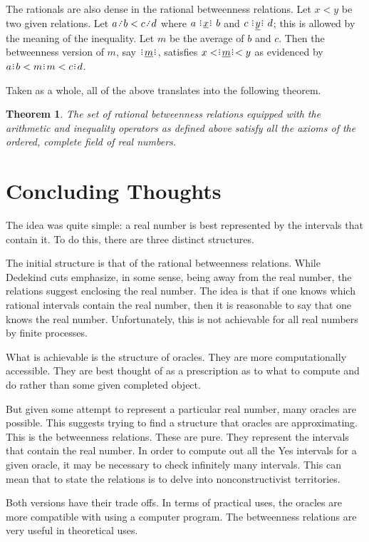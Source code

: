 \documentclass[12pt]{article}
\newtheorem{theorem}{Theorem}[section]
\begin{document}
The rationals are also dense in the rational betweenness relations. Let $x < y$ be two given relations. Let $a \lte b < c \lte d$ where $a \xrel b$ and $c \xrel[y] d$; this is allowed by the meaning of the inequality. Let $m$ be the average of $b$ and $c$. Then the betweenness version of $m$, say $\xrel[m]$, satisfies $x < \xrel[m] < y$ as evidenced by $a\rint b < m\rint m < c\rint d$.

Taken as a whole, all of the above translates into the following theorem.

\begin{theorem}
    The set of rational betweenness relations equipped with the arithmetic and inequality operators as defined above satisfy all the axioms of the ordered, complete field of real numbers. 
\end{theorem}


\section{Concluding Thoughts}

The idea was quite simple:  a real number is best represented by the intervals that contain it. To do this, there are three distinct structures. 

The initial structure is that of the rational betweenness relations. While Dedekind cuts emphasize, in some sense, being away from the real number, the relations suggest enclosing the real number. The idea is that if one knows which rational intervals contain the real number, then it is reasonable to say that one knows the real number. Unfortunately, this is not achievable for all real numbers by finite processes. 

What is achievable is the structure of oracles. They are more computationally accessible. They are best thought of as a prescription as to what to compute and do rather than some given completed object. 

But given some attempt to represent a particular real number, many oracles are possible. This suggests trying to find a structure that oracles are approximating. This is the betweenness relations. These are pure. They represent the intervals that contain the real number. In order to compute out all the Yes intervals for a given oracle, it may be necessary to check infinitely many intervals. This can mean that to state the relations is to delve into nonconstructivist territories. 

Both versions have their trade offs. In terms of practical uses, the oracles are more compatible with using  a computer program. The betweenness relations are very useful in theoretical uses. 
\end{document}
